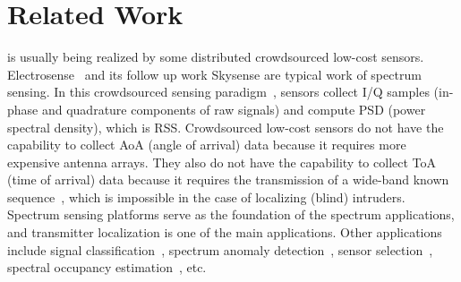 \section{Related Work}
\label{sec:wowmom-related}
 is usually being realized by some distributed crowdsourced low-cost sensors. 
Electrosense~\cite{electrosense} and its follow up work Skysense \cite{mobisys20-skysense} are typical work of spectrum sensing.
In this crowdsourced sensing paradigm~\cite{chakraborty2017specsense}, sensors collect I/Q samples (in-phase and quadrature components of raw signals) and compute PSD (power spectral density), which is RSS.
Crowdsourced low-cost sensors do not have the capability to collect AoA (angle of arrival) data because it requires more expensive antenna arrays.
They also do not have the capability to collect ToA (time of arrival) data because it requires the transmission of a wide-band known sequence~\cite{pimrc2021-localize}, which is impossible in the case of localizing (blind) intruders.
Spectrum sensing platforms serve as the foundation of the spectrum applications, and transmitter localization is one of the main applications.
Other applications include signal classification~\cite{toccn18-sigclassify}, spectrum anomaly detection~\cite{ben-zhao}, sensor selection~\cite{ton-sensorselect,bhattacharya2022fast}, spectral occupancy estimation~\cite{mobicom21-deepradar}, etc.

